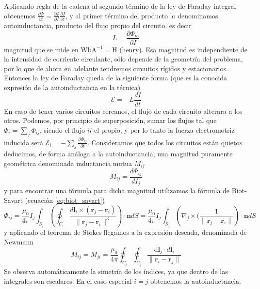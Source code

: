 \documentclass[11pt,a4paper]{article}
\numberwithin{equation}{section}
\begin{document}
Aplicando regla de la cadena al segundo término de la ley de Faraday integral obtenemos $\displaystyle \frac{\partial \Phi}{\partial t} = \frac{\partial \Phi}{\partial I} \frac{\partial I}{\partial t}$, y al primer término del producto lo denominamos autoinductancia, producto del flujo propio del circuito, es decir
\begin{equation}
    L = \frac{\partial\Phi_m}{\partial I}
    \label{eq:im_autoinductancia}
\end{equation}
magnitud que se mide en $\text{Wb}\text{A}^{-1} = \text{H}$ (henry). Esa magnitud es independiente de la intensidad de corriente circulante, sólo depende de la geometría del problema, por lo que de ahora en adelante tendremos circuitos rígidos y estacionarios. Entonces la ley de Faraday queda de la siguiente forma (que es la conocida expresión de la autoinductancia en la técnica)
\begin{equation}
    \mathcal{E} = -L\frac{d I}{d t}
    \label{eq:im_autoinductancia_fem}
\end{equation}
En caso de tener varios circuitos cercanos, el flujo de cada circuito alterara a los otros. Podemos, por principio de superposición, sumar los flujos tal que $\Phi_i = \sum_j \Phi_{ij}$, siendo el flujo $ii$ el propio, y por lo tanto la fuerza electromotriz inducida será $\mathcal{E}_i = - \sum_j \frac{\partial \Phi_{ij}}{\partial t}$. Consideramos que todos los circuitos están quietos deducimos, de forma análoga a la autoinductancia, una magnitud puramente geométrica denominada inductancia mutua $M_{ij}$
\begin{equation}
    M_{ij} = \frac{d \Phi_{ij}}{d I_j}
    \label{eq:im_inductancia_mutua}
\end{equation}
y para encontrar una fórmula para dicha magnitud utilizamos la fórmula de Biot-Savart (ecuación \ref{eq:biot_savart}) \[\Phi_{ij} = \frac{\mu_0}{4\pi} I_j \int_{S_j} \left(\oint_{C_i} \frac{d\textbf{l}_i \times (\textbf{r}_j - \textbf{r}_i)}{\|\textbf{r}_j - \textbf{r}_i\|^3} \right) \cdot \textbf{n} dS = \frac{\mu_0}{4\pi} I_j \int_{S_j} \left(\nabla_j \times (\frac{1}{\|\textbf{r}_j - \textbf{r}_i\|} \right) \cdot \textbf{n} dS\]
y aplicando el teorema de Stokes llegamos a la expresión deseada, denominada de Newmann
\begin{equation}
    M_{ij} = M_{ji} = \frac{\mu_0}{4\pi} \oint_{C_i} \oint_{C_j} \frac{\mathrm{d}\textbf{l}_j \cdot d\textbf{l}_i}{\|\textbf{r}_i - \textbf{r}_j\|}
\end{equation}
Se observa automáticamente la simetría de los índices, ya que dentro de las integrales son escalares. En el caso especial $i = j$ obtenemos la autoinductancia.
\end{document}
